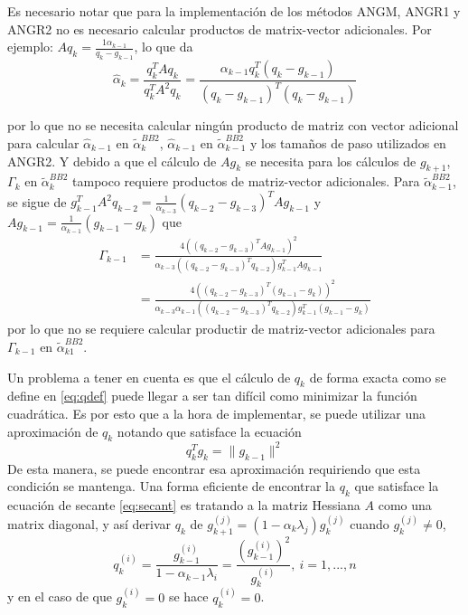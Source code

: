 Es necesario notar que para la implementación de los métodos ANGM, ANGR1 y ANGR2 no es necesario calcular productos de matrix-vector adicionales. Por ejemplo: $Aq_k = \frac{1\alpha_{k-1}}{q_k-g_{k-1}}$, lo que da
\begin{equation}
	\hat{\alpha}_k= \frac{q_k^T A q_k}{q_k^T A^2 q_k} = \frac{\alpha_{k-1}q_k^T(q_k-g_{k-1})}{(q_k - g_{k-1})^T(q_k-g_{k-1})}
\end{equation}

por lo que no se necesita calcular ningún producto de matriz con vector adicional para calcular $\hat{\alpha}_{k-1}$ en $\tilde{\alpha}_k^{BB2}$, $\hat{\alpha}_{k-1}$ en $\tilde{\alpha}_{k-1}^{BB2}$ y los tamaños de paso utilizados en ANGR2. Y debido a que el cálculo de $Ag_k$ se necesita para los cálculos de $g_{k+1}$, $\Gamma_k$ en $\tilde{\alpha}_k^{BB2}$ tampoco requiere productos de matriz-vector adicionales. Para $\tilde{\alpha}_{k-1}^{BB2}$, se sigue de $g_{k-1}^TA^2q_{k-2} = \frac{1}{\alpha_{k-3}}(q_{k-2}-g_{k-3})^TAg_{k-1}$ y $Ag_{k-1}=\frac{1}{\alpha_{k-1}}(g_{k-1}-g_k)$ que 
\begin{align}
	\Gamma_{k-1} &= \frac{4((q_{k-2}-g_{k-3})^TAg_{k-1})^2}{\alpha_{k-3}((q_{k-2}-g_{k-3})^Tq_{k-2})g_{k-1}^T Ag_{k-1}}\\
				 &= \frac{4((q_{k-2}-g_{k-3})^T(g_{k-1}-g_k))^2}{\alpha_{k-3}\alpha_{k-1}((q_{k-2}-g_{k-3})^Tq_{k-2})g_{k-1}^T(g_{k-1}-g_k)}
\end{align}
por lo que no se requiere calcular productir de matriz-vector adicionales para $\Gamma_{k-1}$ en $\tilde{\alpha}_{k1}^{BB2}$.
\par Un problema a tener en cuenta es que el cálculo de $q_k$ de forma exacta como se define en \ref{eq:qdef} puede llegar a ser tan difícil como minimizar la función cuadrática. Es por esto que a la hora de implementar, se puede utilizar una aproximación de $q_k$ notando que satisface la ecuación 
\begin{equation}
	q_k^Tg_k = \|g_{k-1}\|^2
	\label{eq:secant}
\end{equation}
De esta manera, se puede encontrar esa aproximación requiriendo que esta condición se mantenga. Una forma eficiente de encontrar la $q_k$ que satisface la ecuación de secante \ref{eq:secant} es tratando a la matriz Hessiana $A$ como una matrix diagonal, y así derivar $q_k$ de $g_{k+1}^{(j)} = (1-\alpha_k\lambda_j)g_k^{(j)}$ cuando $g_k^{(j)}\neq 0$,
\begin{equation}
	q_k^{(i)} = \frac{g_{k-1}^{(i)}}{1-\alpha_{k-1}\lambda_i} = \frac{(g_{k-1}^{(i)})^2}{g_k^{(i)}}, \ i=1, ..., n
\end{equation}
y en el caso de que $g_k^{(i)}=0$ se hace $q_k^{(i)}=0$.

